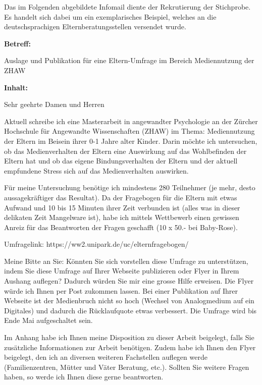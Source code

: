 Das im Folgenden abgebildete Infomail diente der Rekrutierung der Stichprobe. Es handelt sich dabei um ein exemplarisches Beispiel, welches an die deutschsprachigen Elternberatungsstellen versendet wurde.

\begin{flushleft}

\textbf{Betreff:}

Auslage und Publikation für eine Eltern-Umfrage im Bereich Mediennutzung der ZHAW
\vspace{2mm}

\textbf{Inhalt:}

Sehr geehrte Damen und Herren

\vspace{2mm}
Aktuell schreibe ich eine Masterarbeit in angewandter Psychologie an der Zürcher Hochschule für Angewandte Wissenschaften (ZHAW) im Thema: Mediennutzung der Eltern im Beisein ihrer 0-1 Jahre alter Kinder.
Darin möchte ich untersuchen, ob das Medienverhalten der Eltern eine Auswirkung auf das Wohlbefinden der Eltern hat und ob das eigene Bindungsverhalten der Eltern und der aktuell empfundene Stress sich auf das Medienverhalten auswirken. 

\vspace{2mm}
Für meine Untersuchung benötige ich mindestens 280 Teilnehmer (je mehr, desto aussagekräftiger das Resultat). Da der Fragebogen für die Eltern mit etwas Aufwand und 10 bis 15 Minuten ihrer Zeit verbunden ist (alles was in dieser delikaten Zeit Mangelware ist), habe ich mittels Wettbewerb einen gewissen Anreiz für das Beantworten der Fragen geschafft (10 x 50.- bei Baby-Rose).

\vspace{2mm}
Umfragelink: https://ww2.unipark.de/uc/elternfragebogen/

\vspace{2mm}
Meine Bitte an Sie: Könnten Sie sich vorstellen diese Umfrage zu unterstützen, indem Sie diese Umfrage auf Ihrer Webseite publizieren oder Flyer in Ihrem Aushang auflegen? Dadurch würden Sie mir eine grosse Hilfe erweisen. Die Flyer würde ich Ihnen per Post zukommen lassen. Bei einer Publikation auf Ihrer Webseite ist der Medienbruch nicht so hoch (Wechsel von Analogmedium auf ein Digitales) und dadurch die Rücklaufquote etwas verbessert.
Die Umfrage wird bis Ende Mai aufgeschaltet sein.

\vspace{2mm}
Im Anhang habe ich Ihnen meine Disposition zu dieser Arbeit beigelegt, falls Sie zusätzliche Informationen zur Arbeit benötigen. Zudem habe ich Ihnen den Flyer beigelegt, den ich an diversen weiteren Fachstellen auflegen werde (Familienzentren, Mütter und Väter Beratung, etc.). 
Sollten Sie weitere Fragen haben, so werde ich Ihnen diese gerne beantworten.


\end{flushleft}
